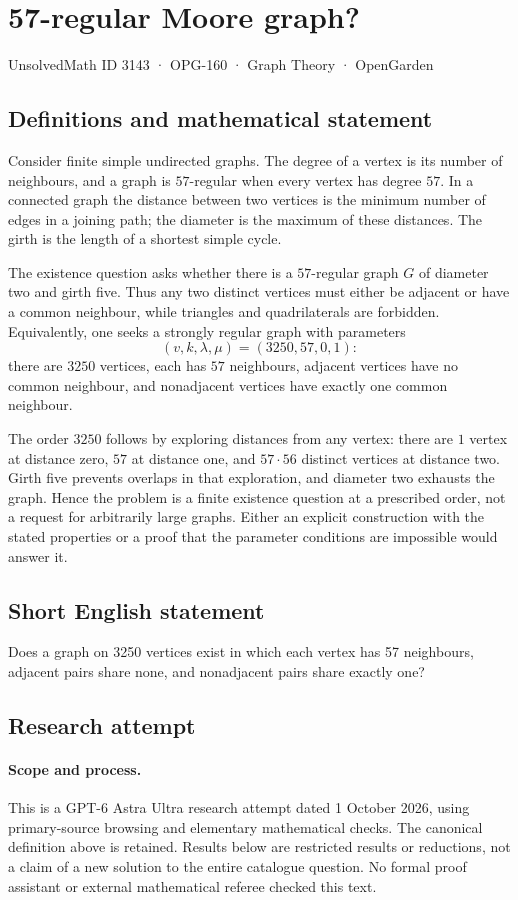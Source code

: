 \documentclass[11pt,a4paper]{article}
\begin{document}
\section*{57-regular Moore graph?}\label{3143}
{\small UnsolvedMath ID 3143 · OPG-160 · Graph Theory · OpenGarden}
\subsection{Definitions and mathematical statement}
Consider finite simple undirected graphs. The degree of a vertex is
its number of neighbours, and a graph is $57$-regular when every
vertex has degree $57$. In a connected graph the distance between
two vertices is the minimum number of edges in a joining path;
the diameter is the maximum of these distances. The girth is the
length of a shortest simple cycle.

The existence question asks whether there is a $57$-regular graph
$G$ of diameter two and girth five. Thus any two distinct vertices
must either be adjacent or have a common neighbour, while triangles
and quadrilaterals are forbidden. Equivalently, one seeks a strongly
regular graph with parameters
\[
 (v,k,\lambda,\mu)=(3250,57,0,1):
\]
there are $3250$ vertices, each has $57$ neighbours, adjacent
vertices have no common neighbour, and nonadjacent vertices have
exactly one common neighbour.

The order $3250$ follows by exploring distances from any vertex:
there are $1$ vertex at distance zero, $57$ at distance one, and
$57\cdot56$ distinct vertices at distance two. Girth five prevents
overlaps in that exploration, and diameter two exhausts the graph.
Hence the problem is a finite existence question at a prescribed
order, not a request for arbitrarily large graphs. Either an
explicit construction with the stated properties or a proof that
the parameter conditions are impossible would answer it.
\subsection{Short English statement}
Does a graph on 3250 vertices exist in which each vertex has 57 neighbours, adjacent pairs share none, and nonadjacent pairs share exactly one?
\subsection{Research attempt}
\paragraph{Scope and process.}
This is a GPT-6 Astra Ultra research attempt dated 1 October 2026, using
primary-source browsing and elementary mathematical checks. The canonical
definition above is retained. Results below are restricted results or
reductions, not a claim of a new solution to the entire catalogue question.
No formal proof assistant or external mathematical referee checked this text.
\end{document}
